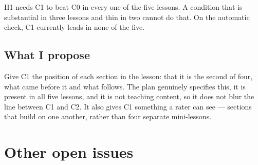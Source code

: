 \documentclass[11pt,a4paper]{article}
\begin{document}
\noindent H1 needs C1 to beat C0 in every one of the five lessons. A condition that is
substantial in three lessons and thin in two cannot do that. On the automatic check, C1
currently leads in none of the five.

\subsection{What I propose}

Give C1 the position of each section in the lesson: that it is the second of four, what came
before it and what follows. The plan genuinely specifies this, it is present in all five
lessons, and it is not teaching content, so it does not blur the line between C1 and C2. It
also gives C1 something a rater can see --- sections that build on one another, rather than
four separate mini-lessons.

\clearpage

\section{Other open issues}
\end{document}
